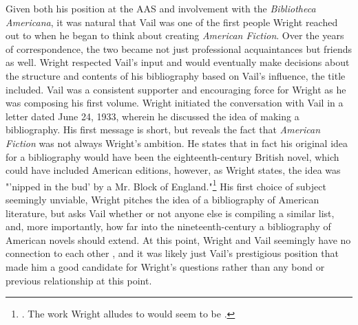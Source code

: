 Given both his position at the AAS and involvement with the \textit{Bibliotheca Americana}, it was natural that Vail was one of the first people Wright reached out to when he began to think about creating \textit{American Fiction}. Over the years of correspondence, the two became not just professional acquaintances but friends as well. Wright respected Vail's input and would eventually make decisions about the structure and contents of his bibliography based on Vail's influence, the title included. Vail was a consistent supporter and encouraging force for Wright as he was composing his first volume. Wright initiated the conversation with Vail in a letter dated June 24, 1933, wherein he discussed the idea of making a bibliography. His first message is short, but reveals the fact that \textit{American Fiction} was not always Wright's ambition. He states  that in fact his original idea for a bibliography would have been the eighteenth-century British novel, which could have included American editions, however, as Wright states, the idea was "'nipped in the bud' by a Mr. Block of England."\footnote{\autocite{lyle_h._wright_letter_1933}. The work Wright alludes to would seem to be \autocite{block_english_1939}.} His first choice of subject seemingly unviable, Wright pitches the idea of a bibliography of American literature, but asks Vail whether or not anyone else is compiling a similar list, and, more importantly, how far into the nineteenth-century a bibliography of American novels should extend. At this point, Wright and Vail seemingly have no connection to each other , and it was likely just Vail's prestigious position that made him a good candidate for Wright's questions rather than any bond or previous relationship at this point.

